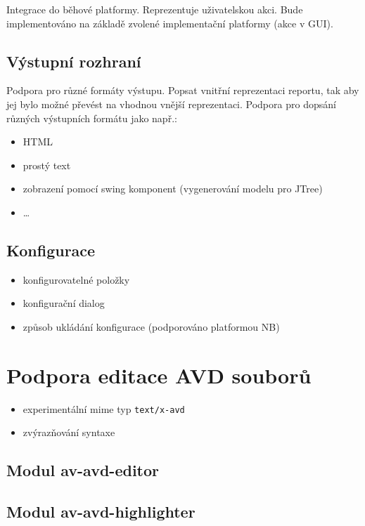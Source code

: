 Integrace do běhové platformy. Reprezentuje uživatelskou akci. Bude implementováno na základě zvolené implementační platformy (akce v GUI).

\subsection{Výstupní rozhraní}
Podpora pro různé formáty výstupu. Popsat vnitřní reprezentaci reportu, tak aby jej bylo možné převést na vhodnou vnější reprezentaci. Podpora pro dopsání různých výstupních formátu jako např.:
\begin{itemize}
\item HTML
\item prostý text
\item zobrazení pomocí swing komponent (vygenerování modelu pro JTree)
\item \ldots
\end{itemize}

\subsection{Konfigurace}
\begin{itemize}
\item konfigurovatelné položky
\item konfigurační dialog
\item způsob ukládání konfigurace (podporováno platformou NB)
\end{itemize}

\section{Podpora editace AVD souborů}
\begin{itemize}
\item experimentální mime typ \verb+text/x-avd+
\item zvýrazňování syntaxe
\end{itemize}

\subsection{Modul av-avd-editor}

\subsection{Modul av-avd-highlighter}
